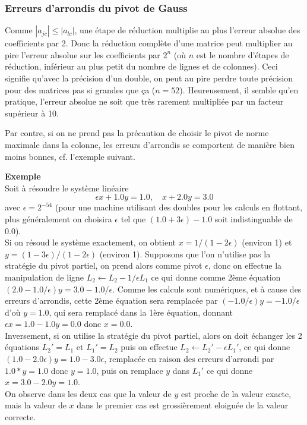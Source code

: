 \documentclass[a4paper,11pt]{article}
\begin{document}
\begin{giacjshere}
\subsubsection{Erreurs d'arrondis du pivot de Gauss} 
Comme $|a_{jc}| \leq |a_{lc}|$, une étape de réduction multiplie
au plus l'erreur absolue des coefficients par 2. Donc la
réduction complète d'une matrice peut multiplier au pire l'erreur
absolue sur les coefficients par $2^n$ (où $n$ est le nombre
d'étapes de réduction, inférieur au plus petit du nombre de lignes
et de colonnes). Ceci signifie qu'avec la précision d'un double,
on peut au pire perdre toute précision pour des matrices pas
si grandes que ça ($n=52$). Heureusement, il semble qu'en pratique, 
l'erreur absolue
ne soit que très rarement multipliée par un facteur supérieur à 10.

Par contre, si on ne prend pas la précaution de choisir le pivot
de norme maximale dans la colonne, les erreurs d'arrondis se
comportent de manière bien moins bonnes, cf. l'exemple suivant.

{\bf Exemple}\\
Soit \`a r\'esoudre le syst\`eme lin\'eaire
\[ \epsilon x + 1.0 y = 1.0 , \quad x + 2.0 y = 3.0 \]
avec $\epsilon =2^{-54}$ (pour une machine utilisant des doubles pour
les calculs en flottant,
plus g\'en\'eralement on choisira $\epsilon$ tel que $(1.0+3\epsilon)-1.0$
soit indistinguable de 0.0).\\
Si on r\'esoud le syst\`eme exactement,
on obtient $x=1/(1-2\epsilon)$ (environ 1)
et $y=(1-3\epsilon)/(1-2\epsilon)$ (environ 1).
Supposons que l'on n'utilise pas la strat\'egie du pivot partiel,
on prend alors comme pivot $\epsilon$, donc on effectue la
manipulation de ligne $L_2 \leftarrow L_2 - 1/\epsilon L_1$ ce qui
donne comme 2\`eme \'equation $(2.0-1.0/\epsilon)y=3.0-1.0/\epsilon$.
Comme les calculs sont num\'eriques, et \`a cause des erreurs
d'arrondis, cette 2\`eme \'equation sera remplac\'ee par
$(-1.0/\epsilon)y=-1.0/\epsilon$ d'o\`u $y=1.0$, qui sera remplac\'e
dans la 1\`ere \'equation, donnant $\epsilon x = 1.0-1.0y=0.0$ donc
$x=0.0$.\\
Inversement, si on utilise la strat\'egie du pivot partiel, alors
on doit \'echanger les 2 \'equations $L_2'=L_1$ et $L_1'=L_2$ puis on effectue
$L_2 \leftarrow L_2' - \epsilon L_1'$, ce qui donne
$(1.0-2.0\epsilon) y = 1.0 - 3.0 \epsilon $, remplac\'ee en raison
des erreurs d'arrondi par $1.0*y=1.0$ donc $y=1.0$, puis on remplace
$y$ dans $L_1'$ ce qui donne $x=3.0-2.0y=1.0$.\\
On observe dans les deux cas que la valeur de $y$ est proche de la
valeur exacte, mais la valeur de $x$ dans le premier cas est
grossi\`erement eloign\'ee de la valeur correcte.


\end{giacjshere}
\end{document}
